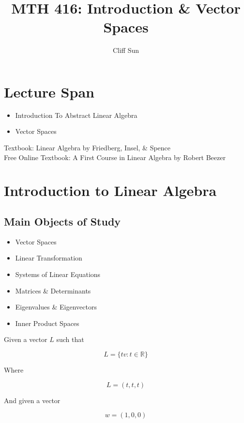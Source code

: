 \documentclass{article}
\title{MTH 416: Introduction \& Vector Spaces}
\author{Cliff Sun}
\newtheorem{one minute paper}[theorem]{One Minute Paper}
\begin{document}
\maketitle

\section*{Lecture Span}
\begin{itemize}
    \item Introduction To Abstract Linear Algebra
    \item Vector Spaces
\end{itemize}

Textbook: Linear Algebra by Friedberg, Insel, \& Spence \\

Free Online Textbook: A First Course in Linear Algebra by Robert Beezer \\

\section*{Introduction to Linear Algebra}

\subsection*{Main Objects of Study}
\begin{itemize}
    \item Vector Spaces
    \item Linear Transformation
    \item Systems of Linear Equations
    \item Matrices \& Determinants
    \item Eigenvalues \& Eigenvectors
    \item Inner Product Spaces
\end{itemize}

Given a vector $L$ such that

\begin{equation}
    L = \{tv : t \in \mathbb{R}\}
\end{equation}

Where 

\begin{equation}
    L = (t, t, t)
\end{equation}

And given a vector 

\begin{equation}
    w = (1,0,0)
\end{equation}
\end{document}

